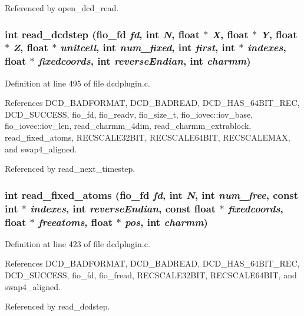 Referenced by open\_\-dcd\_\-read.
\subsubsection{\setlength{\rightskip}{0pt plus 5cm}int read\_\-dcdstep ({\bf fio\_\-fd} {\em fd}, int {\em N}, float $\ast$ {\em X}, float $\ast$ {\em Y}, float $\ast$ {\em Z}, float $\ast$ {\em unitcell}, int {\em num\_\-fixed}, int {\em first}, int $\ast$ {\em indexes}, float $\ast$ {\em fixedcoords}, int {\em reverse\-Endian}, int {\em charmm})\hspace{0.3cm}{\tt  [static]}}\label{dcdplugin_8c_a30}




Definition at line 495 of file dcdplugin.c.

References DCD\_\-BADFORMAT, DCD\_\-BADREAD, DCD\_\-HAS\_\-64BIT\_\-REC, DCD\_\-SUCCESS, fio\_\-fd, fio\_\-readv, fio\_\-size\_\-t, fio\_\-iovec::iov\_\-base, fio\_\-iovec::iov\_\-len, read\_\-charmm\_\-4dim, read\_\-charmm\_\-extrablock, read\_\-fixed\_\-atoms, RECSCALE32BIT, RECSCALE64BIT, RECSCALEMAX, and swap4\_\-aligned.

Referenced by read\_\-next\_\-timestep.
\subsubsection{\setlength{\rightskip}{0pt plus 5cm}int read\_\-fixed\_\-atoms ({\bf fio\_\-fd} {\em fd}, int {\em N}, int {\em num\_\-free}, const int $\ast$ {\em indexes}, int {\em reverse\-Endian}, const float $\ast$ {\em fixedcoords}, float $\ast$ {\em freeatoms}, float $\ast$ {\em pos}, int {\em charmm})\hspace{0.3cm}{\tt  [static]}}\label{dcdplugin_8c_a28}




Definition at line 423 of file dcdplugin.c.

References DCD\_\-BADFORMAT, DCD\_\-BADREAD, DCD\_\-HAS\_\-64BIT\_\-REC, DCD\_\-SUCCESS, fio\_\-fd, fio\_\-fread, RECSCALE32BIT, RECSCALE64BIT, and swap4\_\-aligned.

Referenced by read\_\-dcdstep.
